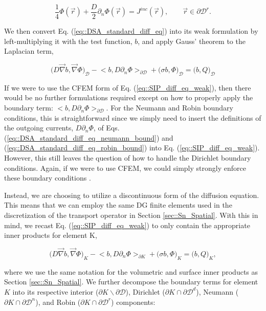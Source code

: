 \begin{equation}
\label{eq::DSA_standard_diff_eq_robin_bound}
\frac{1}{4}\Phi (\vec{r}) + \frac{D}{2} \partial_n \Phi (\vec{r}) = J^{inc} (\vec{r}), \qquad \vec{r} \in \partial \mathcal{D}^r .
\end{equation}

\noindent We then convert Eq. (\ref{eq::DSA_standard_diff_eq}) into its weak formulation by left-multiplying it with the test function, $b$, and apply Gauss' theorem to the Laplacian term,

\begin{equation}
\label{eq::SIP_diff_eq_weak}
\Big(  D \vec{\nabla}  b , \vec{\nabla} \Phi  \Big)_{\mathcal{D}} - \Big<  b, D \partial_n \Phi \Big>_{\partial \mathcal{D}} + \Big(  \sigma   b ,  \Phi  \Big)_{\mathcal{D}}  = \Big(  b, Q  \Big)_{\mathcal{D}}
\end{equation}

\noindent If we were to use the CFEM form of Eq. (\ref{eq::SIP_diff_eq_weak}), then there would be no further formulations required except on how to properly apply the boundary term: $\Big<  b, D \partial_n \Phi \Big>_{\partial \mathcal{D}}$. For the Neumann and Robin boundary conditions, this is straightforward since we simply need to insert the definitions of the outgoing currents, $ D \partial_n \Phi$, of Eqs. (\ref{eq::DSA_standard_diff_eq_neumann_bound}) and (\ref{eq::DSA_standard_diff_eq_robin_bound}) into Eq. (\ref{eq::SIP_diff_eq_weak}). However, this still leaves the question of how to handle the Dirichlet boundary conditions. Again, if we were to use CFEM, we could simply strongly enforce these boundary conditions \cite{akin1982application}.

Instead, we are choosing to utilize a discontinuous form of the diffusion equation. This means that we can employ the same DG finite elements used in the discretization of the transport operator in Section \ref{sec::Sn_Spatial}. With this in mind, we recast Eq. (\ref{eq::SIP_diff_eq_weak}) to only contain the appropriate inner products for element K,

\begin{equation}
\label{eq::SIP_diff_eq_weak_cellK}
\Big(  D \vec{\nabla}  b , \vec{\nabla} \Phi  \Big)_{K} - \Big<  b, D \partial_n \Phi \Big>_{\partial K} + \Big(  \sigma   b ,  \Phi  \Big)_{K}  = \Big(  b, Q  \Big)_{K} ,
\end{equation}

\noindent where we use the same notation for the volumetric and surface inner products as Section \ref{sec::Sn_Spatial}. We further decompose the boundary terms for element $K$ into its respective interior ($\partial K \backslash \partial \mathcal{D}$), Dirichlet ($\partial K \cap \partial \mathcal{D}^d$), Neumann ($\partial K \cap \partial \mathcal{D}^n$), and Robin ($\partial K \cap \partial \mathcal{D}^r$) components:

